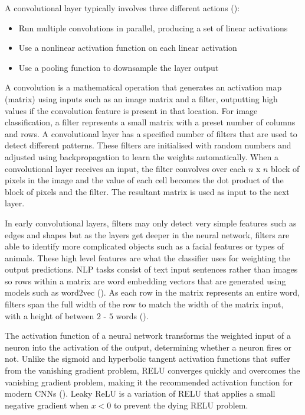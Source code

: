 A convolutional layer typically involves three different actions (\cite{goodfellow_deep_learning_2016}):
\begin{itemize}
    \item Run multiple convolutions in parallel, producing a set of linear activations
    \item Use a nonlinear activation function on each linear activation
    \item Use a pooling function to downsample the layer output
\end{itemize}


A convolution is a mathematical operation that generates an activation map (matrix) using inputs such as an image matrix and a filter, outputting high values if the convolution feature is present in that location. For image classification, a filter represents a small matrix with a preset number of columns and rows.
A convolutional layer has a specified number of filters that are used to detect different patterns. These filters are initialised with random numbers and adjusted using backpropagation to learn the weights automatically.
When a convolutional layer receives an input, the filter convolves over each $n$ x $n$ block of pixels in the image and the value of each cell becomes the dot product of the block of pixels and the filter. The resultant matrix is used as input to the next layer.

In early convolutional layers, filters may only detect very simple features such as edges and shapes but as the layers get deeper in the neural network, filters are able to identify more complicated objects such as a facial features or types of animals. These high level features are what the classifier uses for weighting the output predictions.
\acrshort{NLP} tasks consist of text input sentences rather than images so rows within a matrix are word embedding vectors that are generated using models such as word2vec (\cite{mikolov_word2vec_2013}). 
As each row in the matrix represents an entire word, filters span the full width of the row to match the width of the matrix input, with a height of between $2$ - $5$ words (\cite{lopez_deep_2017}).

The activation function of a neural network transforms the weighted input of a neuron into the activation of the output, determining whether a neuron fires or not. Unlike the sigmoid and hyperbolic tangent activation functions that suffer from the vanishing gradient problem, \acrfull{RELU} converges quickly and overcomes the vanishing gradient problem, making it the recommended activation function for modern \acrshort{CNN}s (\cite{nair_rectified_2010}). 
Leaky ReLU is a variation of \acrshort{RELU} that applies a small negative gradient when $x < 0$ to prevent the dying \acrshort{RELU} problem.

